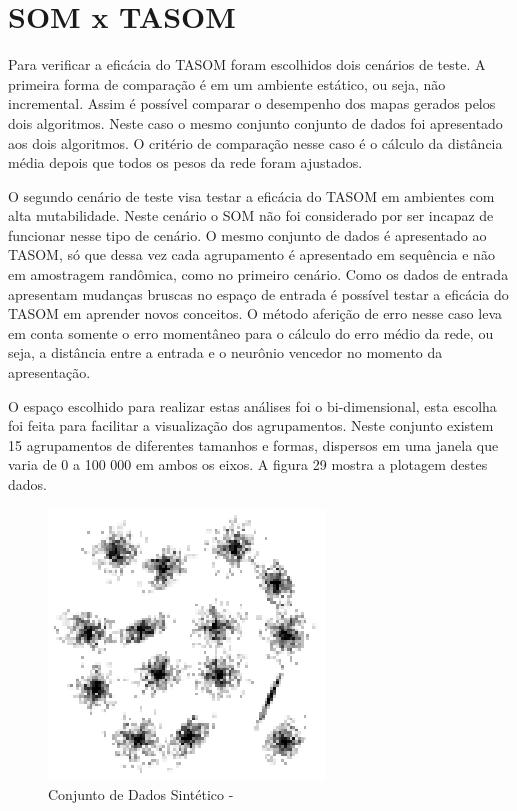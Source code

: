 \chapter{SOM x TASOM}
Para verificar a eficácia do TASOM foram escolhidos dois cenários de teste. A primeira forma de comparação é em um ambiente estático, ou seja, não incremental. Assim é possível comparar o desempenho dos mapas gerados pelos dois algoritmos. Neste caso o mesmo conjunto conjunto de dados foi apresentado aos dois algoritmos. O critério de comparação nesse caso é o cálculo da distância média depois que todos os pesos da rede foram ajustados.

O segundo cenário de teste visa testar a eficácia do TASOM em ambientes com alta mutabilidade. Neste cenário o SOM não foi considerado por ser incapaz de funcionar nesse tipo de cenário. O mesmo conjunto de dados é apresentado ao TASOM, só que dessa vez cada agrupamento é apresentado em sequência e não em amostragem randômica, como no primeiro cenário. Como os dados de entrada apresentam mudanças bruscas no espaço de entrada é possível testar a eficácia do TASOM em aprender novos conceitos. O método aferição de erro nesse caso leva em conta somente o erro momentâneo para o cálculo do erro médio da rede, ou seja, a distância entre a entrada e o neurônio vencedor no momento da apresentação.

O espaço escolhido para realizar estas análises foi o bi-dimensional, esta escolha foi feita  para facilitar a visualização dos agrupamentos. Neste conjunto existem 15 agrupamentos de diferentes tamanhos e formas, dispersos em uma janela que varia de 0 a 100 000 em ambos os eixos. A figura 29 mostra a plotagem destes dados.

\begin{figure}[!h]
\centering
\includegraphics[keepaspectratio=true,scale=1]
{figuras/birch.eps}
\caption{Conjunto de Dados Sintético - }
\label{data_titatic}
\end{figure}


